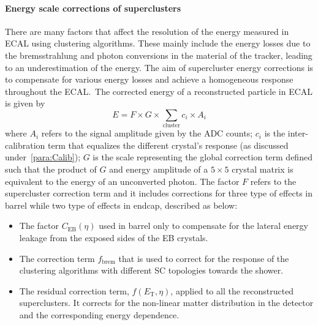 \paragraph{Energy scale corrections of superclusters}
\hspace{\parindent} There are many factors that affect the resolution of the energy measured in ECAL using clustering algorithms.
These mainly include the energy losses due to the bremsstrahlung and photon conversions in the material of the tracker, leading to an underestimation of the energy.
The aim of supercluster energy corrections is to compensate for various energy losses and achieve a homogeneous response throughout the ECAL.\
The corrected energy of a reconstructed particle in ECAL is given by
\begin{equation}
E = F\times{G}\times\sum_{\textrm{cluster}}c_{i}\times{A_{i}}
\end{equation}
where $A_{i}$ refers to the signal amplitude given by the ADC counts; $c_{i}$ is the inter-calibration term that equalizes the different crystal's response
(as discussed under~\ref{para:Calib});
$G$ is the scale representing the global correction term defined such that the product of $G$ and energy amplitude of a $5\times5$ crystal matrix is equivalent to
the energy of an unconverted photon. The factor $F$ refers to the supercluster correction term and it includes corrections for three type of effects in barrel while
two type of effects in endcap, described as below:
\begin{itemize}[leftmargin=*]
  \setlength\itemsep{0.07em}
\item The factor $C_{\textrm{EB}}(\eta)$ used in barrel only to compensate for the lateral energy leakage from the exposed sides of the EB crystals.
\item The correction term $f_{\textrm{brem}}$ that is used to correct for the response of the clustering algorithms with different SC topologies
  towards the shower.
\item The residual correction term, $f(E_{\textrm{T}}, \eta)$, applied to all the reconstructed superclusters. It corrects for the non-linear
  matter distribution in the detector and the corresponding energy dependence.
\end{itemize}
